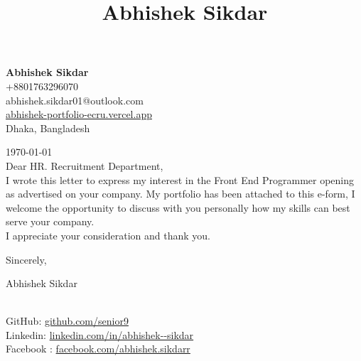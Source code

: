 \documentclass[14pt,a4paper,english]{article}
\title{Abhishek Sikdar}
\begin{document}

\begin{center}
	\begin{singlespace}
\textbf{\large Abhishek Sikdar }\\
+8801763296070 \\
abhishek.sikdar01@outlook.com \\
\url{abhishek-portfolio-ecru.vercel.app} \\
Dhaka, Bangladesh
	\end{singlespace}
\end{center}

\vspace{1cm}
\noindent\today
\vspace{5mm}\\
Dear HR. Recruitment Department,
\vspace{5mm}\\
\noindent I wrote this letter to express my interest in the Front End Programmer opening as advertised on your company. My portfolio has been attached to this e-form, I welcome the opportunity to discuss with you personally how my skills can best serve your company.\\
I appreciate your consideration and thank you.

\vspace{2cm}
\hfill
\begin{minipage}[t]{7cm}
	\flushright
	Sincerely,\\
	\vspace{0.2cm}
	
	Abhishek Sikdar\\
 
\end{minipage}
\vspace{5mm}\\
GitHub: \url{github.com/senior9} \\
Linkedin: \url{linkedin.com/in/abhishek--sikdar}\\
Facebook : \url{facebook.com/abhishek.sikdarr} \\
\end{document}
